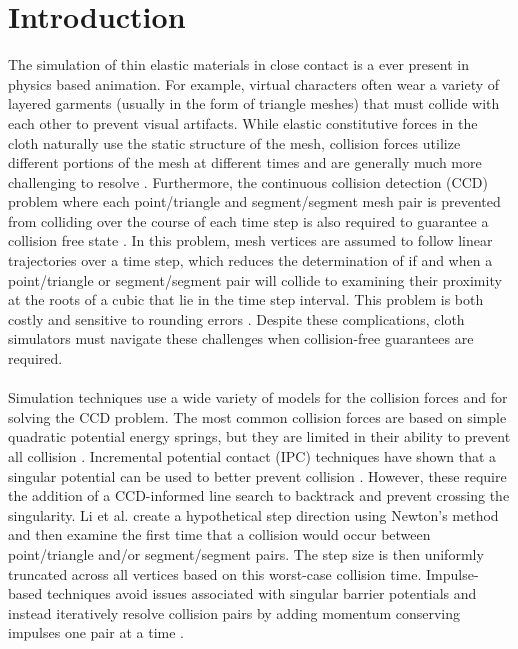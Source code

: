 \documentclass[acmtog,anonymous,review]{acmart}
\begin{document}
\section{Introduction}
The simulation of thin elastic materials in close contact is a ever present in physics based animation.
For example, virtual characters often wear a variety of layered garments (usually in the form of triangle meshes) that must collide with each other to prevent visual artifacts.
While elastic constitutive forces in the cloth naturally use the static structure of the mesh, collision forces utilize different portions of the mesh at different times and are generally much more challenging to resolve \cite{Baraff1998LargeSteps}.
Furthermore, the continuous collision detection (CCD) problem where each point/triangle and segment/segment mesh pair is prevented from colliding over the course of each time step is also required to guarantee a collision free state \cite{bridson2002cloth}.
In this problem, mesh vertices are assumed to follow linear trajectories over a time step, which reduces the determination of if and when a point/triangle or segment/segment pair will collide to examining their proximity at the roots of a cubic that lie in the time step interval.
This problem is both costly and sensitive to rounding errors \cite{brochu:2012:ccd,Wang:2022:FastRootParity}.
Despite these complications, cloth simulators must navigate these challenges when collision-free guarantees are required.\\
\\
Simulation techniques use a wide variety of models for the collision forces and for solving the CCD problem.
The most common collision forces are based on simple quadratic potential energy springs, but they are limited in their ability to prevent all collision \cite{chen2024xpbd}.
Incremental potential contact (IPC) techniques have shown that a singular potential can be used to better prevent collision \cite{li2020ipc}.
However, these require the addition of a CCD-informed line search to backtrack and prevent crossing the singularity.
Li et al.  create a hypothetical step direction using Newton's method and then examine the first time that a collision would occur between point/triangle and/or segment/segment pairs.
The step size is then uniformly truncated across all vertices based on this worst-case collision time.
Impulse-based techniques avoid issues associated with singular barrier potentials and instead iteratively resolve collision pairs by adding momentum conserving impulses one pair at a time \cite{bridson2002cloth}.
\end{document}
